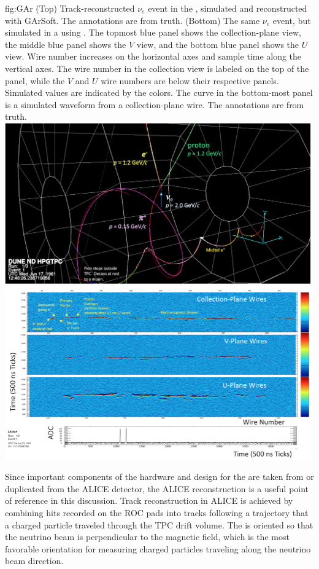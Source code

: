 \begin{dunefigure}{fig:GAr}
{(Top) Track-reconstructed $\nu_e$  event in the , simulated and reconstructed with GArSoft.  The annotations are from  truth. (Bottom) The same $\nu_e$  event, but simulated in a  using .  The topmost blue panel shows the collection-plane view, the middle blue panel shows the $V$ view, and the bottom blue panel shows the $U$ view.  Wire number increases on the horizontal axes and sample time along the vertical axes.   The wire number in the collection view is labeled on the top of the panel, while the $V$ and $U$ wire numbers are below their respective panels. Simulated  values are indicated by the colors.  The curve in the bottom-most panel is a simulated waveform from a collection-plane wire.  The annotations are from  truth.}
    \includegraphics[width=0.99\textwidth]{graphics/Garsoft_evt.png}
    \includegraphics[width=0.99\textwidth]{graphics/nuenppinliquid.png}
\end{dunefigure}


Since important components of the hardware and design for the  are taken from or duplicated from the ALICE detector, the ALICE reconstruction is a useful point of reference in this discussion.
Track reconstruction in ALICE is achieved by combining hits recorded on the ROC pads into tracks following a trajectory that a charged particle traveled through the TPC drift volume.  The  is oriented so that the neutrino beam is perpendicular to the magnetic field, which is the most favorable orientation for measuring charged particles traveling along the neutrino beam direction.   

